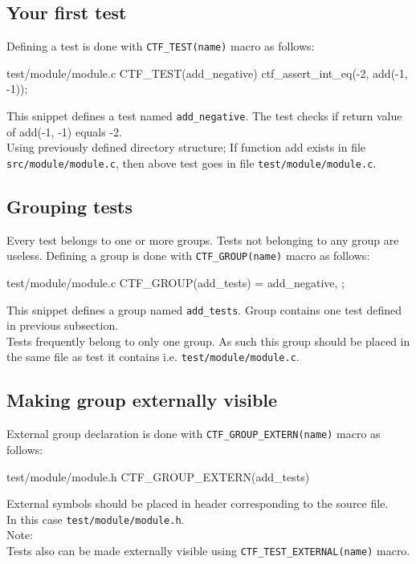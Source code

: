 \documentclass[12pt]{article}
\begin{document}
\subsection{Your first test}
Defining a test is done with \texttt{CTF_TEST(name)} macro as follows:
\begin{ccodefile}{test/module/module.c}
CTF_TEST(add_negative) {
  ctf_assert_int_eq(-2, add(-1, -1));
}
\end{ccodefile}
This snippet defines a test named \texttt{add\_negative}.
The test checks if return value of add(-1, -1) equals -2.\\
Using previously defined directory structure;
If function add exists in file \texttt{src/module/module.c},
then above test goes in file \texttt{test/module/module.c}.
\subsection{Grouping tests}
Every test belongs to one or more groups.
Tests not belonging to any group are useless.
Defining a group is done with \texttt{CTF_GROUP(name)} macro as follows:
\begin{ccodefile}{test/module/module.c}
CTF_GROUP(add_tests) = {
  add_negative,
};
\end{ccodefile}
This snippet defines a group named \texttt{add\_tests}.
Group contains one test defined in previous subsection.\\
Tests frequently belong to only one group. As such this group should be placed in
the same file as test it contains i.e. \texttt{test/module/module.c}.
\subsection{Making group externally visible}
External group declaration is done with \texttt{CTF_GROUP_EXTERN(name)} macro
as follows:
\begin{ccodefile}{test/module/module.h}
CTF_GROUP_EXTERN(add_tests)
\end{ccodefile}
External symbols should be placed in header corresponding to the source file.\\
In this case \texttt{test/module/module.h}.\\
Note:\\
Tests also can be made externally visible
using \texttt{CTF_TEST_EXTERNAL(name)} macro.
\end{document}
